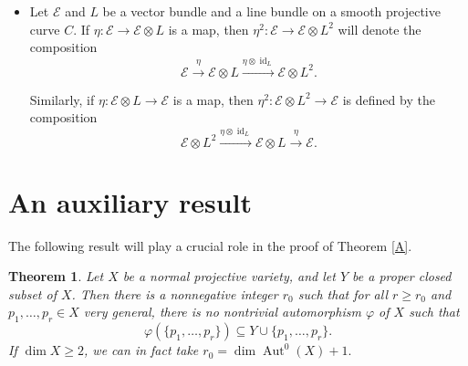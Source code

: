 \documentclass[11pt,letterpaper]{amsart}
\newtheorem{theorem}[lemma]{Theorem}
\begin{document}
\begin{itemize}
We also have a natural nondegenerate pairing
\[
\operatorname{End}(V)\times \operatorname{End}(V)
\longrightarrow
\mathbb{C},
\qquad
(\varphi,\psi)\longmapsto
\operatorname{tr}(\varphi\psi).
\]
Its restriction to $\mathfrak{sl}(V)$ is also nondegenerate. Consequently, we have natural isomorphisms
\[
\operatorname{End}(V)\cong \operatorname{End}(V)^*,
\qquad
\mathfrak{sl}(V)\cong \mathfrak{sl}(V)^*.
\]
Similarly, if $\mathcal{E}$ is a rank two vector bundle on a smooth projective curve $C$, then we have the split short exact sequence
\[
0\longrightarrow
\mathfrak{sl}(\mathcal{E})
\longrightarrow
\mathcal{E}nd(\mathcal{E})
\xrightarrow{\operatorname{tr}}
\mathcal{O}_C
\longrightarrow
0,
\]
and natural isomorphisms
\[
\mathcal{E}nd(\mathcal{E})
\cong
\mathcal{E}nd(\mathcal{E})^*,
\qquad
\mathfrak{sl}(\mathcal{E})
\cong
\mathfrak{sl}(\mathcal{E})^*.
\]
\item Let $\mathcal{E}$ and $L$ be a vector bundle and a line bundle on a smooth
projective curve $C$. If $\eta:\mathcal{E}\longrightarrow \mathcal{E}\otimes L$ is a map, then $\eta^2:\mathcal{E}\longrightarrow \mathcal{E}\otimes L^2$ will denote the composition
\[
\mathcal{E}
\xrightarrow{\eta}
\mathcal{E}\otimes L
\xrightarrow{\eta\otimes\operatorname{id}_L}
\mathcal{E}\otimes L^{2}.
\]

Similarly, if $
\eta:\mathcal{E}\otimes L\longrightarrow \mathcal{E}$
is a map, then $\eta^{2}:\mathcal{E}\otimes L^{2}\longrightarrow \mathcal{E}$ is
defined by the composition
\[
\mathcal{E}\otimes L^{2}
\xrightarrow{\eta\otimes\operatorname{id}_L}
\mathcal{E}\otimes L
\xrightarrow{\eta}
\mathcal{E}.
\]
\end{itemize}
\section{An auxiliary result}
The following result will play a crucial role in the proof of Theorem \ref{A}.
\begin{theorem}\label{permute}
Let $X$ be a normal projective variety, and let $Y$ be a proper closed subset of $X$. Then there is a nonnegative integer $r_0$ such that for all $r\ge r_0$ and $p_1,\ldots,p_r\in X$ very general, there is no nontrivial automorphism $\varphi$ of $X$ such that
\begin{equation}\label{contain}
\varphi(\{p_1,\ldots,p_r\})\subseteq Y\cup\{p_1,\ldots,p_r\}.
\end{equation} If $\dim X\geq 2$, we can in fact take $r_0=\dim\operatorname{Aut}^0(X)+1.$
\end{theorem}
\end{document}
